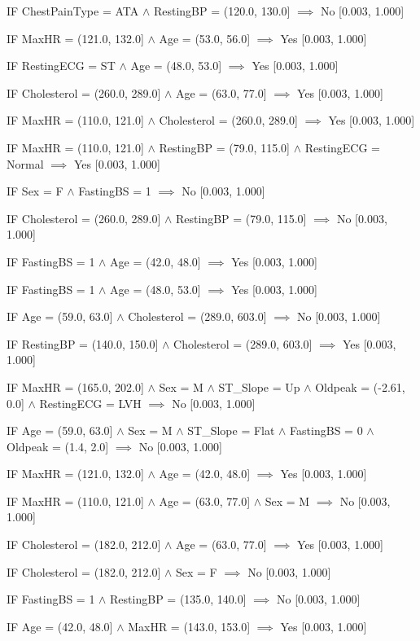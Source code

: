 IF ChestPainType = ATA $\land$ RestingBP = (120.0, 130.0] $\implies$ No [0.003, 1.000]

IF MaxHR = (121.0, 132.0] $\land$ Age = (53.0, 56.0] $\implies$ Yes [0.003, 1.000]

IF RestingECG = ST $\land$ Age = (48.0, 53.0] $\implies$ Yes [0.003, 1.000]

IF Cholesterol = (260.0, 289.0] $\land$ Age = (63.0, 77.0] $\implies$ Yes [0.003, 1.000]

IF MaxHR = (110.0, 121.0] $\land$ Cholesterol = (260.0, 289.0] $\implies$ Yes [0.003, 1.000]

IF MaxHR = (110.0, 121.0] $\land$ RestingBP = (79.0, 115.0] $\land$ RestingECG = Normal $\implies$ Yes [0.003, 1.000]

IF Sex = F $\land$ FastingBS = 1 $\implies$ No [0.003, 1.000]

IF Cholesterol = (260.0, 289.0] $\land$ RestingBP = (79.0, 115.0] $\implies$ No [0.003, 1.000]

IF FastingBS = 1 $\land$ Age = (42.0, 48.0] $\implies$ Yes [0.003, 1.000]

IF FastingBS = 1 $\land$ Age = (48.0, 53.0] $\implies$ Yes [0.003, 1.000]

IF Age = (59.0, 63.0] $\land$ Cholesterol = (289.0, 603.0] $\implies$ No [0.003, 1.000]

IF RestingBP = (140.0, 150.0] $\land$ Cholesterol = (289.0, 603.0] $\implies$ Yes [0.003, 1.000]

IF MaxHR = (165.0, 202.0] $\land$ Sex = M $\land$ ST\_Slope = Up $\land$ Oldpeak = (-2.61, 0.0] $\land$ RestingECG = LVH $\implies$ No [0.003, 1.000]

IF Age = (59.0, 63.0] $\land$ Sex = M $\land$ ST\_Slope = Flat $\land$ FastingBS = 0 $\land$ Oldpeak = (1.4, 2.0] $\implies$ No [0.003, 1.000]

IF MaxHR = (121.0, 132.0] $\land$ Age = (42.0, 48.0] $\implies$ Yes [0.003, 1.000]

IF MaxHR = (110.0, 121.0] $\land$ Age = (63.0, 77.0] $\land$ Sex = M $\implies$ No [0.003, 1.000]

IF Cholesterol = (182.0, 212.0] $\land$ Age = (63.0, 77.0] $\implies$ Yes [0.003, 1.000]

IF Cholesterol = (182.0, 212.0] $\land$ Sex = F $\implies$ No [0.003, 1.000]

IF FastingBS = 1 $\land$ RestingBP = (135.0, 140.0] $\implies$ No [0.003, 1.000]

IF Age = (42.0, 48.0] $\land$ MaxHR = (143.0, 153.0] $\implies$ Yes [0.003, 1.000]

